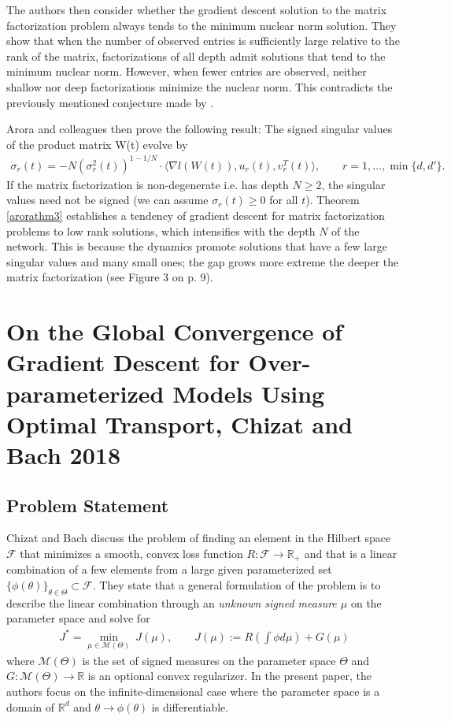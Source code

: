 \documentclass{article}
\newenvironment{manualtheorem}[1]{%
  \renewcommand\themanualtheoreminner{#1}%
  \manualtheoreminner
}{\endmanualtheoreminner}
\begin{document}
The authors then consider whether the gradient descent solution to the matrix factorization problem always tends to the minimum nuclear norm solution. They show that when the number of observed entries is sufficiently large relative to the rank of the matrix, factorizations of all depth admit solutions that tend to the minimum nuclear norm. However, when fewer entries are observed, neither shallow nor deep factorizations minimize the nuclear norm. This contradicts the previously mentioned conjecture made by \cite{gunasekar2018implicit}.

Arora and colleagues then prove the following result:
\begin{manualtheorem}{3}\label{arorathm3}
The signed singular values of the product matrix W(t) evolve by 
\begin{align*}
    \dot{\sigma}_r(t) = -N (\sigma_r^2(t))^{1-1/N} \cdot \langle \nabla l(W(t)), u_r(t), v_r^T(t) \rangle, \qquad r = 1, \ldots, \min\{d, d'\}.
\end{align*}
If the matrix factorization is non-degenerate i.e. has depth $N \geq 2$, the singular values need not be signed (we can assume $\sigma_r(t) \geq 0$ for all $t$).
\end{manualtheorem}
Theorem \ref{arorathm3} establishes a tendency of gradient descent for matrix factorization problems to low rank solutions, which intensifies with the depth $N$ of the network. This is because the dynamics promote solutions that have a few large singular values and many small ones; the gap grows more extreme the deeper the matrix factorization (see Figure 3 on p. 9).

\section{On the Global Convergence of Gradient Descent for Over-parameterized Models Using Optimal Transport, Chizat and Bach 2018}

\subsection{Problem Statement}
Chizat and Bach discuss the problem of finding an element in the Hilbert space $\mathcal{F}$ that minimizes a smooth, convex loss function $R: \mathcal{F} \rightarrow \mathbb{R}_+$ and that is a linear combination of a few elements from a large given parameterized set $\{ \phi(\theta) \}_{\theta \in \Theta} \subset \mathcal{F}$. They state that a general formulation of the problem is to describe the linear combination through an \textit{unknown signed measure $\mu$} on the parameter space and solve for
\begin{align*}
    J^* = \underset{\mu \in \mathcal{M}(\Theta)}{\min} \ J(\mu), \qquad J(\mu) := R \left( \int \phi d\mu \right) + G(\mu)
\end{align*}
where $\mathcal{M}(\Theta)$ is the set of signed measures on the parameter space $\Theta$ and $G: \mathcal{M}(\Theta) \rightarrow \mathbb{R}$ is an optional convex regularizer. In the present paper, the authors focus on the infinite-dimensional case where the parameter space is a domain of $\mathbb{R}^d$ and $\theta \rightarrow \phi(\theta)$ is differentiable.
\end{document}
